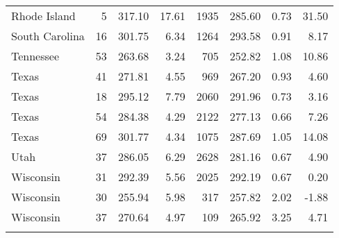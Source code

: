 \begin{longtable}{lrrr@{\extracolsep{10pt}}rrrr}
  Rhode Island &   5 & 317.10 & 17.61 & 1935 & 285.60 & 0.73 & 31.50 \\ 
  South Carolina &  16 & 301.75 & 6.34 & 1264 & 293.58 & 0.91 & 8.17 \\ 
  Tennessee &  53 & 263.68 & 3.24 & 705 & 252.82 & 1.08 & 10.86 \\ 
  Texas &  41 & 271.81 & 4.55 & 969 & 267.20 & 0.93 & 4.60 \\ 
  Texas &  18 & 295.12 & 7.79 & 2060 & 291.96 & 0.73 & 3.16 \\ 
  Texas &  54 & 284.38 & 4.29 & 2122 & 277.13 & 0.66 & 7.26 \\ 
  Texas &  69 & 301.77 & 4.34 & 1075 & 287.69 & 1.05 & 14.08 \\ 
  Utah &  37 & 286.05 & 6.29 & 2628 & 281.16 & 0.67 & 4.90 \\ 
  Wisconsin &  31 & 292.39 & 5.56 & 2025 & 292.19 & 0.67 & 0.20 \\ 
  Wisconsin &  30 & 255.94 & 5.98 & 317 & 257.82 & 2.02 & -1.88 \\ 
  Wisconsin &  37 & 270.64 & 4.97 & 109 & 265.92 & 3.25 & 4.71 \\ 
   \hline
\hline
\label{g8mathtreelevel1}
\end{longtable}
